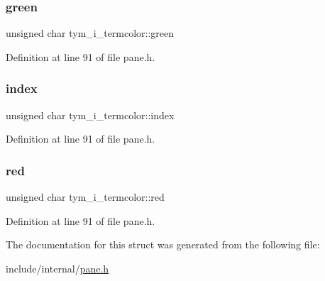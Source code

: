 \mbox{\label{structtym__i__termcolor_a092c59261dd150740bb26bc7d991248d}} 
\subsubsection{\texorpdfstring{green}{green}}
{\footnotesize\ttfamily unsigned char tym\+\_\+i\+\_\+termcolor\+::green}



Definition at line 91 of file pane.\+h.

\mbox{\label{structtym__i__termcolor_a585cff3cf5a42dfe19f69eb5e82e5e1f}} 
\subsubsection{\texorpdfstring{index}{index}}
{\footnotesize\ttfamily unsigned char tym\+\_\+i\+\_\+termcolor\+::index}



Definition at line 91 of file pane.\+h.

\mbox{\label{structtym__i__termcolor_a8a900030d25c4baca2956508afeab5b9}} 
\subsubsection{\texorpdfstring{red}{red}}
{\footnotesize\ttfamily unsigned char tym\+\_\+i\+\_\+termcolor\+::red}



Definition at line 91 of file pane.\+h.



The documentation for this struct was generated from the following file\+:\begin{DoxyCompactItemize}
\item 
include/internal/\hyperlink{pane_8h}{pane.\+h}\end{DoxyCompactItemize}
